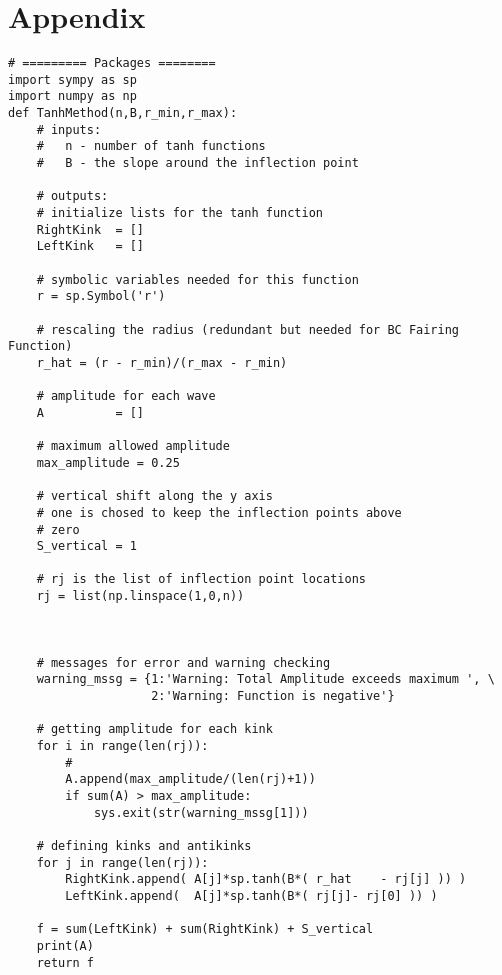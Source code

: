 \documentclass[a4paper]{article}
\begin{document}
\section{Appendix}
\begin{verbatim}
# ========= Packages ========
import sympy as sp 
import numpy as np
def TanhMethod(n,B,r_min,r_max):
    # inputs: 
    #   n - number of tanh functions
    #   B - the slope around the inflection point
    
    # outputs:     
    # initialize lists for the tanh function
    RightKink  = []
    LeftKink   = []
   
    # symbolic variables needed for this function
    r = sp.Symbol('r')
    
    # rescaling the radius (redundant but needed for BC Fairing Function)
    r_hat = (r - r_min)/(r_max - r_min)    
    
    # amplitude for each wave
    A          = []
    
    # maximum allowed amplitude 
    max_amplitude = 0.25
   
    # vertical shift along the y axis
    # one is chosed to keep the inflection points above 
    # zero
    S_vertical = 1
    
    # rj is the list of inflection point locations
    rj = list(np.linspace(1,0,n))


    
    # messages for error and warning checking 
    warning_mssg = {1:'Warning: Total Amplitude exceeds maximum ', \
                    2:'Warning: Function is negative'}
    
    # getting amplitude for each kink
    for i in range(len(rj)):
        # 
        A.append(max_amplitude/(len(rj)+1))
        if sum(A) > max_amplitude:
            sys.exit(str(warning_mssg[1]))
    
    # defining kinks and antikinks
    for j in range(len(rj)):
        RightKink.append( A[j]*sp.tanh(B*( r_hat    - rj[j] )) )
        LeftKink.append(  A[j]*sp.tanh(B*( rj[j]- rj[0] )) )   
    
    f = sum(LeftKink) + sum(RightKink) + S_vertical
    print(A)
    return f

\end{verbatim}
\end{document}
